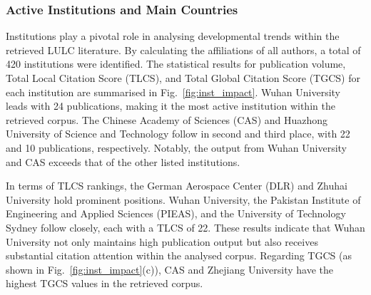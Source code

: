 \documentclass[]{interact}
\theoremstyle{plain}%
\theoremstyle{definition}
\theoremstyle{remark}
\DeclareRobustCommand{\DIFadd}[1]{{\protect\color{DIFaddcolor}\uwave{#1}}}
\DeclareRobustCommand{\DIFdel}[1]{{\protect\color{DIFdelcolor}\sout{#1}}}
\def\DIFadd#1{#1}%
\def\DIFdel#1{}%
\begin{document}
\subsubsection{Active Institutions and Main Countries}
Institutions play a pivotal role in \DIFdel{analyzing} \DIFdel{global} \DIFadd{analysing} developmental trends within \DIFdel{a} \DIFdel{specific} \DIFdel{academic} \DIFdel{field} \DIFadd{the} \DIFadd{retrieved} \DIFadd{LULC} \DIFadd{literature}. By calculating the affiliations of all authors, a total of 420 institutions were identified. The statistical results for publication volume, \DIFadd{Total} Local Citation Score (TLCS), and Total Global Citation Score (TGCS) for each institution are \DIFdel{summarized} \DIFadd{summarised} in Fig.~\ref{fig:inst_impact}. Wuhan University leads with 24 publications, making it the most active institution \DIFdel{in} \DIFdel{this} \DIFdel{field} \DIFadd{within} \DIFadd{the} \DIFadd{retrieved} \DIFadd{corpus}. The Chinese Academy of Sciences (CAS) and Huazhong University of Science and Technology follow in second and third place, with 22 and 10 publications, respectively. Notably, the output from Wuhan University and CAS \DIFdel{significantly} exceeds that of \DIFadd{the} other \DIFadd{listed} institutions.


In terms of TLCS rankings, the German Aerospace Center (DLR) and Zhuhai University hold prominent positions. Wuhan University, \DIFadd{the} \DIFadd{Pakistan} \DIFadd{Institute} \DIFadd{of} \DIFadd{Engineering} \DIFadd{and} \DIFadd{Applied} \DIFadd{Sciences} \DIFadd{(}PIEAS\DIFadd{)}, and \DIFadd{the} University of Technology Sydney follow closely, each with a TLCS of 22. These results indicate that Wuhan University not only maintains high \DIFdel{annual} \DIFadd{publication} output but also \DIFdel{commands} \DIFdel{significant} \DIFdel{academic} \DIFdel{recognition} \DIFadd{receives} \DIFadd{substantial} \DIFadd{citation} \DIFadd{attention} within the \DIFdel{field} \DIFadd{analysed} \DIFadd{corpus}. Regarding TGCS (as shown in Fig.~\ref{fig:inst_impact}(c)), CAS and Zhejiang University \DIFdel{emerge} \DIFdel{as} \DIFadd{have} the \DIFdel{leading} \DIFdel{global} \DIFdel{institutions} \DIFadd{highest} \DIFadd{TGCS} \DIFadd{values} \DIFadd{in} \DIFadd{the} \DIFadd{retrieved} \DIFadd{corpus}. 
\end{document}
